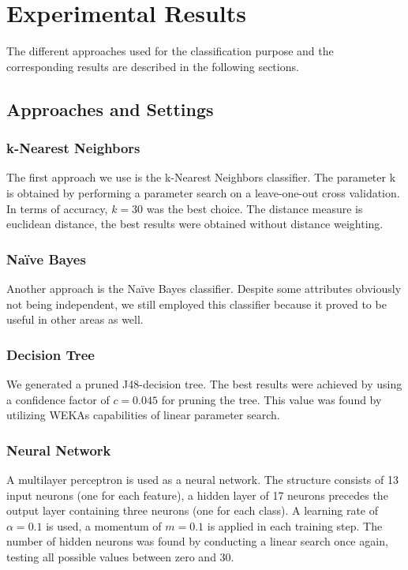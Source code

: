 \section{Experimental Results}
The different approaches used for the classification purpose and the corresponding results are described in the following sections. 
\subsection{Approaches and Settings}

\subsubsection*{k-Nearest Neighbors}
The first approach we use is the k-Nearest Neighbors classifier. The
parameter k is obtained by performing a parameter search on a
leave-one-out cross validation. In terms of accuracy, \(k=30\) was
the best choice. The distance measure is euclidean distance, the best
results were obtained without distance weighting.

\subsubsection*{Na\"ive Bayes}
Another approach is the Na\"ive Bayes classifier. Despite some
attributes obviously not being independent, we still employed this
classifier because it proved to be useful in other areas as well.

\subsubsection*{Decision Tree}
We generated a pruned J48-decision tree. The best results were
achieved by using a confidence factor of \(c=0.045\) for pruning the
tree. This value was found by utilizing WEKAs capabilities of linear
parameter search.

\subsubsection*{Neural Network}
A multilayer perceptron is used as a neural network. The structure
consists of 13 input neurons (one for each feature), a hidden layer
of 17 neurons precedes the output layer containing three neurons
(one for each class). A learning rate of \(\alpha=0.1\) is used, a momentum of
\(m=0.1\) is applied in each training step. The number of hidden
neurons was found by conducting a linear search once again, testing
all possible values between zero and 30.

